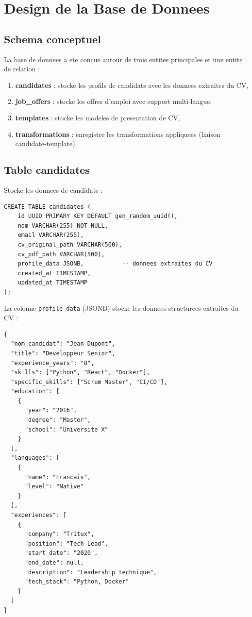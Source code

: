 \section{Design de la Base de Donnees}

\subsection{Schema conceptuel}

La base de donnees a ete concue autour de trois entites principales et une entite de relation :

\begin{enumerate}
    \item \textbf{candidates} : stocke les profils de candidats avec les donnees extraites du CV,
    
    \item \textbf{job\_offers} : stocke les offres d'emploi avec support multi-langue,
    
    \item \textbf{templates} : stocke les modeles de presentation de CV,
    
    \item \textbf{transformations} : enregistre les transformations appliquees (liaison candidate-template).
\end{enumerate}

\subsection{Table candidates}

Stocke les donnees de candidats :

\begin{verbatim}
CREATE TABLE candidates (
    id UUID PRIMARY KEY DEFAULT gen_random_uuid(),
    nom VARCHAR(255) NOT NULL,
    email VARCHAR(255),
    cv_original_path VARCHAR(500),
    cv_pdf_path VARCHAR(500),
    profile_data JSONB,           -- donnees extraites du CV
    created_at TIMESTAMP,
    updated_at TIMESTAMP
);
\end{verbatim}

La colonne \texttt{profile\_data} (JSONB) stocke les donnees structurees extraites du CV :
\begin{verbatim}
{
  "nom_candidat": "Jean Dupont",
  "title": "Developpeur Senior",
  "experience_years": "8",
  "skills": ["Python", "React", "Docker"],
  "specific_skills": ["Scrum Master", "CI/CD"],
  "education": [
    {
      "year": "2016",
      "degree": "Master",
      "school": "Universite X"
    }
  ],
  "languages": [
    {
      "name": "Francais",
      "level": "Native"
    }
  ],
  "experiences": [
    {
      "company": "Tritux",
      "position": "Tech Lead",
      "start_date": "2020",
      "end_date": null,
      "description": "Leadership technique",
      "tech_stack": "Python, Docker"
    }
  ]
}
\end{verbatim}

